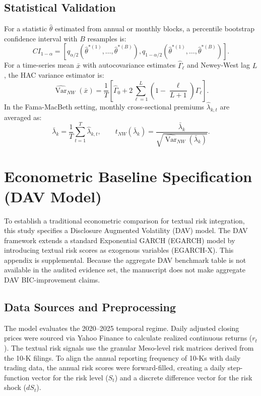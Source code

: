 \documentclass[11pt, a4paper]{article}
\begin{document}
\subsection{Statistical Validation}
For a statistic $\hat{\theta}$ estimated from annual or monthly blocks, a percentile bootstrap confidence interval with $B$ resamples is:
\begin{equation}
CI_{1-\alpha}=\left[q_{\alpha/2}\left(\hat{\theta}^{*(1)},\ldots,\hat{\theta}^{*(B)}\right),
q_{1-\alpha/2}\left(\hat{\theta}^{*(1)},\ldots,\hat{\theta}^{*(B)}\right)\right].
\end{equation}
For a time-series mean $\bar{x}$ with autocovariance estimates $\hat{\Gamma}_{\ell}$ and Newey-West lag $L$, the HAC variance estimator is:
\begin{equation}
\widehat{\operatorname{Var}}_{NW}(\bar{x})=\frac{1}{T}\left[\hat{\Gamma}_0+
2\sum_{\ell=1}^{L}\left(1-\frac{\ell}{L+1}\right)\hat{\Gamma}_{\ell}\right].
\end{equation}
In the Fama-MacBeth setting, monthly cross-sectional premiums $\hat{\lambda}_{k,t}$ are averaged as:
\begin{equation}
\bar{\lambda}_{k}=\frac{1}{T}\sum_{t=1}^{T}\hat{\lambda}_{k,t},\qquad
t_{NW}(\bar{\lambda}_k)=\frac{\bar{\lambda}_k}{\sqrt{\widehat{\operatorname{Var}}_{NW}(\bar{\lambda}_k)}}.
\end{equation}

\newpage

\section{Econometric Baseline Specification (DAV Model)}
To establish a traditional econometric comparison for textual risk integration, this study specifies a Disclosure Augmented Volatility (DAV) model. The DAV framework extends a standard Exponential GARCH (EGARCH) model by introducing textual risk scores as exogenous variables (EGARCH-X). This appendix is supplemental. Because the aggregate DAV benchmark table is not available in the audited evidence set, the manuscript does not make aggregate DAV BIC-improvement claims.

\subsection{Data Sources and Preprocessing}
The model evaluates the 2020--2025 temporal regime. Daily adjusted closing prices were sourced via Yahoo Finance to calculate realized continuous returns ($r_t$). The textual risk signals use the granular Meso-level risk matrices derived from the 10-K filings. To align the annual reporting frequency of 10-Ks with daily trading data, the annual risk scores were forward-filled, creating a daily step-function vector for the risk level ($S_t$) and a discrete difference vector for the risk shock ($dS_t$).
\end{document}
